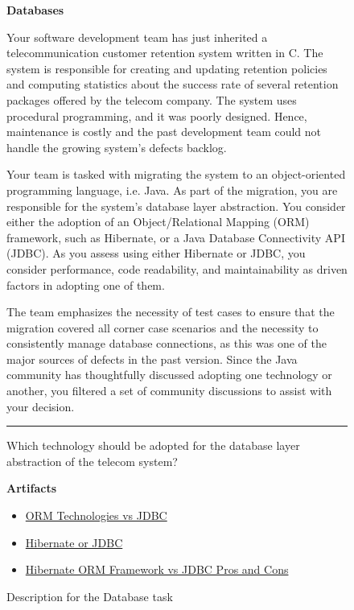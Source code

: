 \begin{figure}
\begin{mdframed}[backgroundcolor=gray!05] 
\begin{scriptsize}

{\large \textbf{Databases}} \bigskip


Your software development team has just inherited a telecommunication customer retention system written in C. The system is responsible for creating and updating retention policies and computing
statistics about the success rate of several retention packages offered by the telecom company. The system uses procedural programming, and it was poorly designed. Hence, maintenance is costly and the
past development team could not handle the growing system's defects backlog. \medskip


Your team is tasked with migrating the system to an object-oriented programming language, i.e. Java. As part of the migration, you are responsible for the system's database layer abstraction. You consider either the adoption of an Object/Relational Mapping (ORM) framework, such as Hibernate, or a Java Database Connectivity API (JDBC). As you assess using either Hibernate or JDBC, you consider performance,
code readability, and maintainability as driven factors in adopting one of them.  \medskip

The team emphasizes the necessity of test cases to ensure that the migration covered all corner case scenarios and the necessity to consistently manage database connections, as this was one of the major sources of defects in the past version. Since the Java community has thoughtfully discussed adopting one technology or another, you filtered a set of community discussions to assist with your decision.


\begin{center}
\rule{10cm}{0.4pt}
\end{center}

Which technology should be adopted for the database layer abstraction of the telecom system?

\medskip

\textbf{Artifacts}

\begin{itemize}
    \item \href{https://stackoverflow.com/questions/1575762/orm-technologies-vs-jdbc}{ORM Technologies vs JDBC}
    \item \href{https://stackoverflow.com/questions/1353137/hibernate-or-jdbc}{Hibernate or JDBC}
    \item \href{https://stackoverflow.com/questions/35955020/hibernate-orm-framework-vs-jdbc-pros-and-cons}{Hibernate ORM Framework vs JDBC Pros and Cons}
\end{itemize}

\end{scriptsize}
\end{mdframed}
\caption{Description for the Database task}
\end{figure}

    
